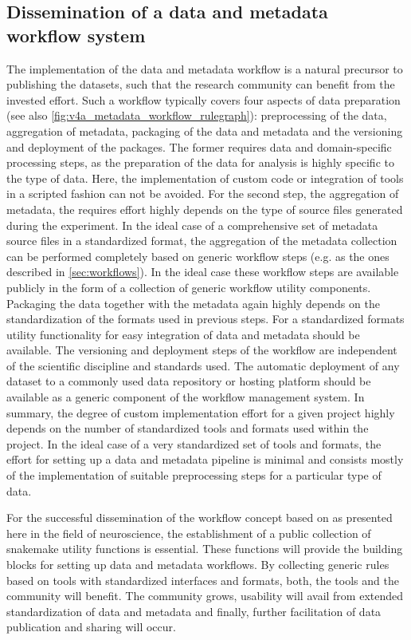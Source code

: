 \subsection{Dissemination of a data and metadata workflow system}
The implementation of the data and metadata workflow is a natural precursor to publishing the datasets, such that the research community can benefit from the invested effort. Such a workflow typically covers four aspects of data preparation (see also \cref{fig:v4a_metadata_workflow_rulegraph}): preprocessing of the data, aggregation of metadata, packaging of the data and metadata and the versioning and deployment of the packages. The former requires data and domain-specific processing steps, as the preparation of the data for analysis is highly specific to the type of data. Here, the implementation of custom code or integration of tools in a scripted fashion can not be avoided. For the second step, the aggregation of metadata, the requires effort highly depends on the type of source files generated during the experiment. In the ideal case of a comprehensive set of metadata source files in a standardized format, the aggregation of the metadata collection can be performed completely based on generic workflow steps (e.g. as the ones described in \ref{sec:workflows}). In the ideal case these workflow steps are available publicly in the form of a collection of generic workflow utility components. Packaging the data together with the metadata again highly depends on the standardization of the formats used in previous steps. For a standardized formats utility functionality for easy integration of data and metadata should be available. The versioning and deployment steps of the workflow are independent of the scientific discipline and standards used. The automatic deployment of any dataset to a commonly used data repository or hosting platform should be available as a generic component of the workflow management system. In summary, the degree of custom implementation effort for a given project highly depends on the number of standardized tools and formats used within the project. In the ideal case of a very standardized set of tools and formats, the effort for setting up a data and metadata pipeline is minimal and consists mostly of the implementation of suitable preprocessing steps for a particular type of data. 

For the successful dissemination of the workflow concept based on   as presented here in the field of neuroscience, the establishment of a public collection of snakemake utility functions is essential. These functions will provide the building blocks for setting up data and metadata workflows. By collecting generic rules based on tools with standardized interfaces and formats, both, the tools and the community will benefit.  The community grows, usability will avail from extended standardization of data and metadata and finally, further facilitation of data publication and sharing will occur.


